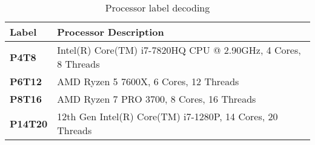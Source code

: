 
\begin{table}[ht]
\centering
\caption{Processor label decoding}
\label{tab:processor_decoding}
\begin{tabular}{l|l}
\hline
\textbf{Label} & \textbf{Processor Description} \\
\hline
\textbf{P4T8} & Intel(R) Core(TM) i7-7820HQ CPU @ 2.90GHz, 4 Cores, 8 Threads \\ \hline
\textbf{P6T12} & AMD Ryzen 5 7600X, 6 Cores, 12 Threads \\ \hline
\textbf{P8T16} & AMD Ryzen 7 PRO 3700, 8 Cores, 16 Threads \\ \hline
\textbf{P14T20} & 12th Gen Intel(R) Core(TM) i7-1280P, 14 Cores, 20 Threads \\ \hline

\end{tabular}
\end{table}
